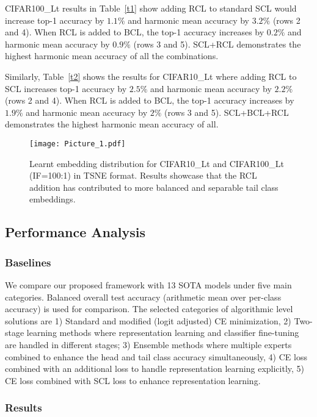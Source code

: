 CIFAR100\_Lt results in Table~\ref{t1} show adding RCL to standard SCL would increase top-1 accuracy by $1.1\%$ and harmonic mean accuracy by $3.2\%$ (rows 2 and 4). When RCL is added to BCL, the top-1 accuracy increases by $0.2\%$ and harmonic mean accuracy by $0.9\%$ (rows 3 and 5). SCL+RCL demonstrates the highest harmonic mean accuracy of all the combinations.

Similarly, Table~\ref{t2} shows the results for CIFAR10\_Lt where adding RCL to SCL  increases top-1 accuracy by $2.5\%$ and harmonic mean accuracy by $2.2\%$ (rows 2 and 4). When RCL is added to BCL, the top-1 accuracy increases by $1.9\%$ and harmonic mean accuracy by $2\%$ (rows 3 and 5). SCL+BCL+RCL demonstrates the highest harmonic mean accuracy of all.

\begin{figure}[bt]
    \centering
    \texttt{[image: Picture\_1.pdf]}
    \caption{Learnt embedding distribution for CIFAR10\_Lt and CIFAR100\_Lt (IF=100:1) in TSNE format. Results showcase that the RCL addition has contributed to more balanced and separable tail class embeddings.} 
    \label{three}
    \vspace{-4mm}
\end{figure}

\subsection{Performance Analysis}

\subsubsection{Baselines}
We compare our proposed framework with 13 SOTA models under five main categories. Balanced overall test accuracy (arithmetic mean over per-class accuracy)
is used for comparison. The selected categories of algorithmic level solutions  are 1) Standard and modified (logit adjusted) CE minimization, 2) Two-stage learning methods where representation learning and classifier fine-tuning are handled in different stages; 3) Ensemble methods where multiple experts combined to enhance the head and tail class accuracy simultaneously, 4) CE loss combined with an additional loss to handle representation learning explicitly, 5) CE loss combined with SCL loss to enhance representation learning.

\subsubsection{Results}

